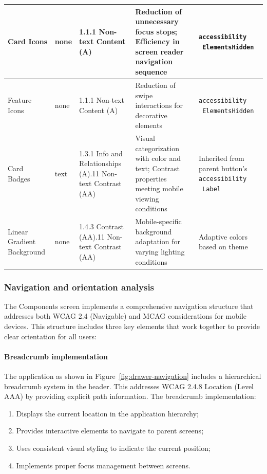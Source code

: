 \begin{longtable}[c]{|C{2.7cm}|C{1.8cm}|C{3cm}|C{3.5cm}|C{4.5cm}|}
\hline
Card Icons & none & 1.1.1 Non-text Content (A) & Reduction of unnecessary focus stops; Efficiency in screen reader navigation sequence & \texttt{accessibility \ ElementsHidden} \\
\hline
Feature Icons & none & 1.1.1 Non-text Content (A) & Reduction of swipe interactions for decorative elements & \texttt{accessibility \ ElementsHidden} \\
\hline
Card Badges & text & 1.3.1 Info and Relationships (A).11 Non-text Contrast (AA) & Visual categorization with color and text; Contrast properties meeting mobile viewing conditions & Inherited from parent button's \texttt{accessibility \ Label} \\
\hline
Linear Gradient Background & none & 1.4.3 Contrast (AA).11 Non-text Contrast (AA) & Mobile-specific background adaptation for varying lighting conditions & Adaptive colors based on theme \\
\hline
\end{longtable}

\FloatBarrier

\subsubsection{Navigation and orientation analysis}

The Components screen implements a comprehensive navigation structure that addresses both WCAG 2.4 (Navigable) and MCAG considerations for mobile devices. This structure includes three key elements that work together to provide clear orientation for all users:

\paragraph{Breadcrumb implementation}

The application as shown in Figure~\ref{fig:drawer-navigation} includes a hierarchical breadcrumb system in the header. This addresses WCAG 2.4.8 Location (Level AAA) by providing explicit path information. The breadcrumb implementation:

\begin{enumerate}
    \item Displays the current location in the application hierarchy;
    \item Provides interactive elements to navigate to parent screens;
    \item Uses consistent visual styling to indicate the current position;
    \item Implements proper focus management between screens.
\end{enumerate}

